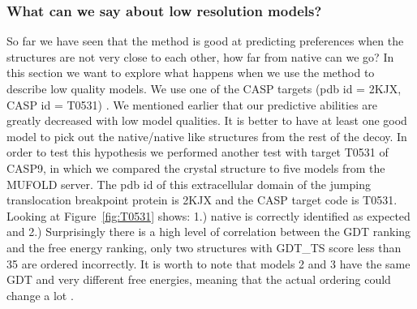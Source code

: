 \documentclass[12pt]{article}
\begin{document}
\subsubsection{What can we say about low resolution models?}

So far we have seen that the method is good at predicting preferences when the structures are not
very close to each other, how far from native can we go? In this section we want to explore what
happens when we use the method to describe low quality models. We use one of the CASP targets (pdb
id = 2KJX, CASP id = T0531) .
We mentioned earlier that our predictive abilities are greatly decreased with low model qualities. It is
better to have at least one good model to pick out the native/native like structures from the rest of the decoy. 
In order to test this hypothesis we performed another test with target T0531 of CASP9, in which we compared the crystal 
structure to five models from the MUFOLD server. The pdb id of this extracellular domain of the jumping translocation 
breakpoint protein is 2KJX and the CASP target code is T0531.
Looking at Figure~\ref{fig:T0531} shows: 1.) native is correctly
identified as expected and 2.) Surprisingly there is a high level of correlation between the GDT
ranking and the free energy ranking, only two structures with GDT\_TS score less than  35  are ordered
incorrectly. It is worth to note that models 2 and 3 have the same GDT and very different free
energies, meaning that the actual ordering could change a lot \cite{Perez2012}.


\end{document}
